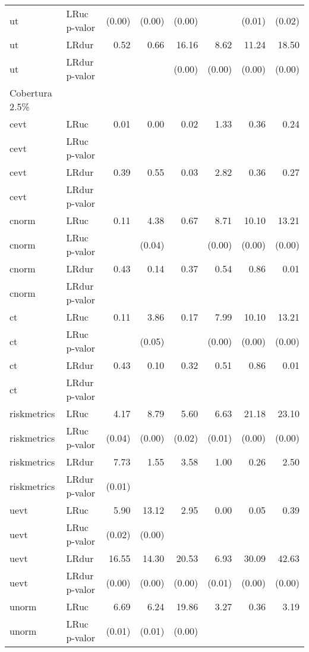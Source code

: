 \begin{longtable}{llrrrrrr}
  ut & LRuc p-valor & (0.00) & (0.00) & (0.00) &  & (0.01) & (0.02) \\ 
  ut & LRdur & 0.52 & 0.66 & 16.16 & 8.62 & 11.24 & 18.50 \\ 
  ut & LRdur p-valor &  &  & (0.00) & (0.00) & (0.00) & (0.00) \\ 
  Cobertura 2.5\% &  &  &  &  &  &  &  \\ 
  cevt & LRuc & 0.01 & 0.00 & 0.02 & 1.33 & 0.36 & 0.24 \\ 
  cevt & LRuc p-valor &  &  &  &  &  &  \\ 
  cevt & LRdur & 0.39 & 0.55 & 0.03 & 2.82 & 0.36 & 0.27 \\ 
  cevt & LRdur p-valor &  &  &  &  &  &  \\ 
  cnorm & LRuc & 0.11 & 4.38 & 0.67 & 8.71 & 10.10 & 13.21 \\ 
  cnorm & LRuc p-valor &  & (0.04) &  & (0.00) & (0.00) & (0.00) \\ 
  cnorm & LRdur & 0.43 & 0.14 & 0.37 & 0.54 & 0.86 & 0.01 \\ 
  cnorm & LRdur p-valor &  &  &  &  &  &  \\ 
  ct & LRuc & 0.11 & 3.86 & 0.17 & 7.99 & 10.10 & 13.21 \\ 
  ct & LRuc p-valor &  & (0.05) &  & (0.00) & (0.00) & (0.00) \\ 
  ct & LRdur & 0.43 & 0.10 & 0.32 & 0.51 & 0.86 & 0.01 \\ 
  ct & LRdur p-valor &  &  &  &  &  &  \\ 
  riskmetrics & LRuc & 4.17 & 8.79 & 5.60 & 6.63 & 21.18 & 23.10 \\ 
  riskmetrics & LRuc p-valor & (0.04) & (0.00) & (0.02) & (0.01) & (0.00) & (0.00) \\ 
  riskmetrics & LRdur & 7.73 & 1.55 & 3.58 & 1.00 & 0.26 & 2.50 \\ 
  riskmetrics & LRdur p-valor & (0.01) &  &  &  &  &  \\ 
  uevt & LRuc & 5.90 & 13.12 & 2.95 & 0.00 & 0.05 & 0.39 \\ 
  uevt & LRuc p-valor & (0.02) & (0.00) &  &  &  &  \\ 
  uevt & LRdur & 16.55 & 14.30 & 20.53 & 6.93 & 30.09 & 42.63 \\ 
  uevt & LRdur p-valor & (0.00) & (0.00) & (0.00) & (0.01) & (0.00) & (0.00) \\ 
  unorm & LRuc & 6.69 & 6.24 & 19.86 & 3.27 & 0.36 & 3.19 \\ 
  unorm & LRuc p-valor & (0.01) & (0.01) & (0.00) &  &  &  \\ 

\end{longtable}
